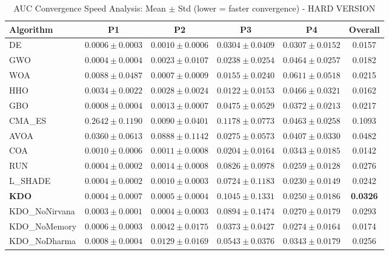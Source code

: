 \begin{table}[htbp]
\centering
\caption{AUC Convergence Speed Analysis: Mean $\pm$ Std (lower = faster convergence) - HARD VERSION}
\label{tab:auc}
\small
\begin{tabular}{lccccc}
\toprule
\textbf{Algorithm} & \textbf{P1} & \textbf{P2} & \textbf{P3} & \textbf{P4} & \textbf{Overall} \\
\midrule
DE & $0.0006 \pm 0.0003$ & $0.0010 \pm 0.0006$ & $0.0304 \pm 0.0409$ & $0.0307 \pm 0.0152$ & 0.0157 \\
GWO & $0.0004 \pm 0.0004$ & $0.0023 \pm 0.0107$ & $0.0238 \pm 0.0254$ & $0.0464 \pm 0.0257$ & 0.0182 \\
WOA & $0.0088 \pm 0.0487$ & $0.0007 \pm 0.0009$ & $0.0155 \pm 0.0240$ & $0.0611 \pm 0.0518$ & 0.0215 \\
HHO & $0.0034 \pm 0.0022$ & $0.0028 \pm 0.0024$ & $0.0122 \pm 0.0153$ & $0.0466 \pm 0.0321$ & 0.0162 \\
GBO & $0.0008 \pm 0.0004$ & $0.0013 \pm 0.0007$ & $0.0475 \pm 0.0529$ & $0.0372 \pm 0.0213$ & 0.0217 \\
CMA_ES & $0.2642 \pm 0.1190$ & $0.0090 \pm 0.0401$ & $0.1178 \pm 0.0773$ & $0.0463 \pm 0.0258$ & 0.1093 \\
AVOA & $0.0360 \pm 0.0613$ & $0.0888 \pm 0.1142$ & $0.0275 \pm 0.0573$ & $0.0407 \pm 0.0330$ & 0.0482 \\
COA & $0.0010 \pm 0.0006$ & $0.0011 \pm 0.0008$ & $0.0204 \pm 0.0164$ & $0.0343 \pm 0.0185$ & 0.0142 \\
RUN & $0.0004 \pm 0.0002$ & $0.0014 \pm 0.0008$ & $0.0826 \pm 0.0978$ & $0.0259 \pm 0.0128$ & 0.0276 \\
L_SHADE & $0.0004 \pm 0.0002$ & $0.0010 \pm 0.0003$ & $0.0724 \pm 0.1183$ & $0.0230 \pm 0.0149$ & 0.0242 \\
\textbf{KDO} & $0.0004 \pm 0.0007$ & $0.0005 \pm 0.0004$ & $0.1045 \pm 0.1331$ & $0.0250 \pm 0.0186$ & \textbf{0.0326} \\
KDO_NoNirvana & $0.0003 \pm 0.0001$ & $0.0004 \pm 0.0003$ & $0.0894 \pm 0.1474$ & $0.0270 \pm 0.0179$ & 0.0293 \\
KDO_NoMemory & $0.0006 \pm 0.0003$ & $0.0042 \pm 0.0175$ & $0.0373 \pm 0.0427$ & $0.0274 \pm 0.0164$ & 0.0174 \\
KDO_NoDharma & $0.0008 \pm 0.0004$ & $0.0129 \pm 0.0169$ & $0.0543 \pm 0.0376$ & $0.0343 \pm 0.0179$ & 0.0256 \\
\bottomrule
\end{tabular}
\end{table}
